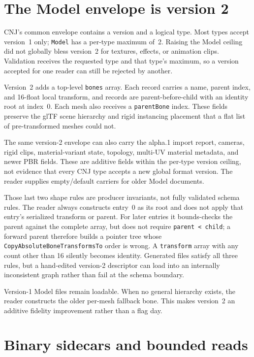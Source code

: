 \section{The Model envelope is version 2}

CNJ's common envelope contains a version and a logical type. Most types accept version~1 only;
\texttt{Model} has a per-type maximum of~2. Raising the Model ceiling did not globally bless
version~2 for textures, effects, or animation clips. Validation receives the requested type
and that type's maximum, so a version accepted for one reader can still be rejected by another.

Version~2 adds a top-level \texttt{bones} array. Each record carries a name, parent index, and
16-float local transform, and records are parent-before-child with an identity root at index~0.
Each mesh also receives a \texttt{parentBone} index. These fields preserve the glTF scene
hierarchy and rigid instancing placement that a flat list of pre-transformed meshes could not.

The same version-2 envelope can also carry the alpha.1 import report, cameras, rigid clips,
material-variant state, topology, multi-UV material metadata, and newer PBR fields. These are
additive fields within the per-type version ceiling, not evidence that every CNJ type accepts a
new global format version. The reader supplies empty/default carriers for older Model documents.

Those last two shape rules are producer invariants, not fully validated schema rules. The reader
always constructs entry~0 as its root and does not apply that entry's serialized transform or
parent. For later entries it bounds-checks the parent against the complete array, but does not
require \texttt{parent < child}; a forward parent therefore builds a pointer tree whose
\texttt{CopyAbsoluteBoneTransformsTo} order is wrong. A \texttt{transform} array with any count
other than 16 silently becomes identity. Generated files satisfy all three rules, but a hand-edited
version-2 descriptor can load into an internally inconsistent graph rather than fail at the schema
boundary.

Version-1 Model files remain loadable. When no general hierarchy exists, the reader constructs
the older per-mesh fallback bone. This makes version~2 an additive fidelity improvement rather
than a flag day.

\section{Binary sidecars and bounded reads}


